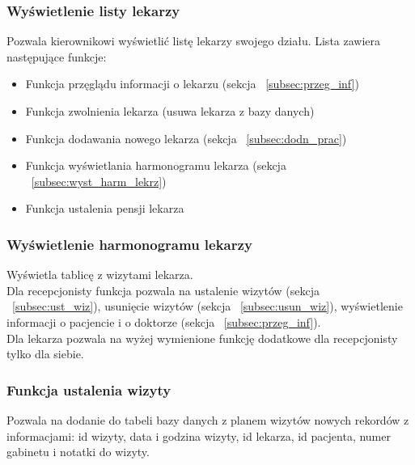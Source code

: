 \begin{flushleft}
    \subsubsection{\large{Wyświetlenie listy lekarzy }\label{subsec:wyst_lekrz}}
    Pozwala kierownikowi wyświetlić listę lekarzy swojego działu. Lista zawiera następujące funkcje:
    \begin{itemize}
        \item Funkcja przęglądu informacji o lekarzu (sekcja ~\ref{subsec:przeg_inf})
        \item Funkcja zwolnienia lekarza (usuwa lekarza z bazy danych)
        \item Funkcja dodawania nowego lekarza (sekcja ~\ref{subsec:dodn_prac})
        \item Funkcja wyświetlania harmonogramu lekarza (sekcja ~\ref{subsec:wyst_harm_lekrz})
        \item Funkcja ustalenia pensji lekarza
    \end{itemize}
\end{flushleft}

\begin{flushleft}
    \subsubsection{\large{Wyświetlenie harmonogramu lekarzy }\label{subsec:wyst_harm_lekrz}}
    Wyświetla tablicę z wizytami lekarza.\\
    \hspace{5mm}Dla recepcjonisty funkcja pozwala na ustalenie wizytów (sekcja ~\ref{subsec:ust_wiz}), usunięcie wizytów (sekcja ~\ref{subsec:usun_wiz}), wyświetlenie informacji o pacjencie i o doktorze (sekcja ~\ref{subsec:przeg_inf}).\\
    \hspace{5mm}Dla lekarza pozwala na wyżej wymienione funkcję dodatkowe dla recepcjonisty tylko dla siebie.
\end{flushleft}

\begin{flushleft}
    \subsubsection{\large{Funkcja ustalenia wizyty }\label{subsec:ust_wiz}}
    Pozwala na dodanie do tabeli bazy danych z planem wizytów nowych rekordów z informacjami: id wizyty, data i godzina wizyty, id lekarza, id pacjenta, numer gabinetu i notatki do wizyty.
\end{flushleft}

